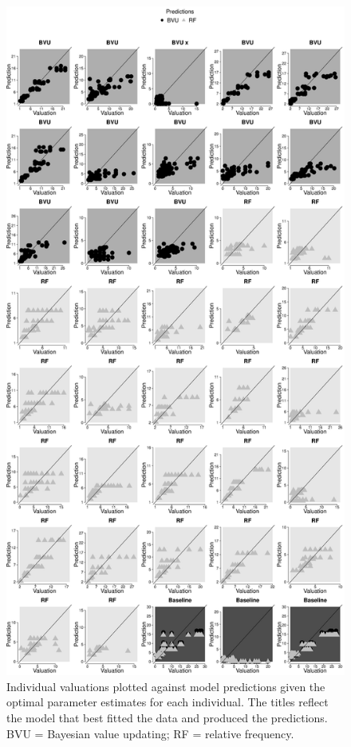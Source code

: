 \documentclass[a4paper,man, natbib]{apa6} %
\begin{document}
\begin{figure}[htbp] 
  \centering
\includegraphics[width=.9\linewidth,height = .9\textheight, keepaspectratio]{modelcomp2_qual.eps}%
  \caption{Individual valuations plotted against model predictions given the optimal parameter estimates for each individual. The titles reflect the model that best fitted the data and produced the predictions. BVU = Bayesian value updating; RF = relative frequency.}
  \label{fig:ind.fits2}
\end{figure}
\end{document}
